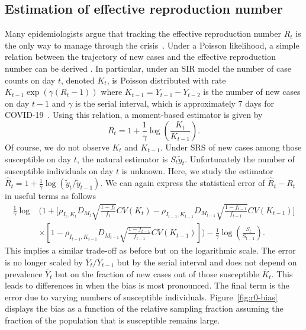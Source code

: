 \documentclass[12pt]{amsart}
\numberwithin{equation}{section}
\theoremstyle{plain}
\begin{document}
\subsection{Estimation of effective reproduction number}
\label{section:r0-estimation}
Many epidemiologists argue that tracking the effective reproduction number $R_t$ is the only way to manage through the crisis~\citep{Gabriel2020}.  Under a Poisson likelihood, a simple relation between the trajectory of new cases and the effective reproduction number can be derived \citep{Bettencourt2008}.  In particular, under an SIR model the number of case counts on day $t$, denoted $K_t$, is Poisson distributed with rate $K_{t-1} \exp \left( \gamma (R_t - 1) \right)$ where $K_{t-1} = Y_{t-1}-Y_{t-2}$ is the number of new cases on day $t-1$ and $\gamma$ is the serial interval, which is approximately $7$ days for COVID-19~\citep{Sanche2020}.  Using this relation, a moment-based estimator is given by
$$
R_t = 1 + \frac{1}{\gamma} \log \left( \frac{K_t}{K_{t-1}} \right).
$$
Of course, we do not observe $K_t$ and $K_{t-1}$.  Under SRS of new cases among those susceptible on day $t$, the natural estimator is $S_t \tilde y_t$.  Unfortunately the number of susceptible individuals on day $t$ is unknown.  Here, we study the estimator $\hat R_t = 1 + \frac{1}{\gamma} \log \left( \tilde y_t / \tilde y_{t-1} \right)$. We can again express the statistical error of $\hat R_t - R_t$ in useful terms as follows
$$
\begin{aligned}
\frac{1}{\gamma}\log &\bigg( 1 + \bigg[ \rho_{I_t,K_t} D_{M_t} \sqrt{\frac{1-f_t}{f_t}} CV (K_t)  -\rho_{I_{t-1},K_{t-1}} D_{M_{t-1}} \sqrt{\frac{1-f_{t-1}}{f_{t-1}}} CV (K_{t-1}) \bigg] \\
&\times \left[ 1 - \rho_{I_{t-1},K_{t-1}} D_{M_{t-1}} \sqrt{\frac{1-f_{t-1}}{f_{t-1}}} CV (K_{t-1}) \right] \bigg) - \frac{1}{\gamma} \log \left( \frac{S_t}{S_{t-1}} \right).
\end{aligned}
$$
This implies a similar trade-off as before but on the logarithmic scale.  The error is no longer scaled by $\bar Y_t/\bar Y_{t-1}$ but by the serial interval and does not depend on prevalence $\bar Y_t$ but on the fraction of new cases out of those susceptible $\bar K_t$. This leads to differences in when the bias is most pronounced. The final term is the error due to varying numbers of susceptible individuals.  Figure~\ref{fig:r0-bias} displays the bias as a function of the relative sampling fraction assuming the fraction of the population that is susceptible remains large.
\end{document}
